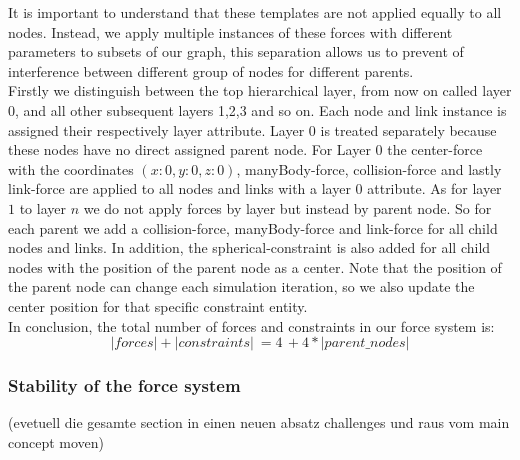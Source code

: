 It is important to understand that these templates are not applied equally to all nodes. Instead, we apply multiple instances of these forces with different parameters to subsets of our graph, this separation allows us to prevent of interference between different group of nodes for different parents.\\ 
Firstly we distinguish between the top hierarchical layer, from now on called layer $0$, and all other subsequent layers 1,2,3 and so on. Each node and link instance is assigned their respectively layer attribute. Layer $0$ is treated separately because these nodes have no direct assigned parent node. 
For Layer $0$ the center-force with the coordinates $(x:0,y:0,z:0)$, manyBody-force, collision-force and lastly link-force are applied to all nodes and links with a layer $0$ attribute. 
As for layer $1$ to layer $n$ we do not apply forces by layer but instead by parent node. So for each parent we add a collision-force, manyBody-force and link-force for all child nodes and links. In addition, the spherical-constraint is also added for all child nodes with the position of the parent node as a center. Note that the position of the parent node can change each simulation iteration, so we also update the center position for that specific constraint entity.\\
In conclusion, the total number of forces and constraints in our force system is: 
\begin{equation}
    |forces| + |constraints| \: = 4 \, + 4 * |parent\_nodes|
\end{equation}

\subsubsection{Stability of the force system}
(evetuell die gesamte section in einen neuen absatz challenges und raus vom main concept moven)

